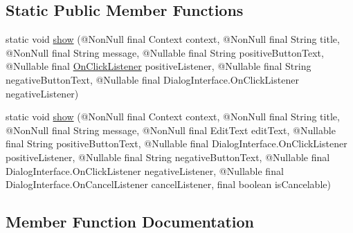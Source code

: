 \subsection*{Static Public Member Functions}
\begin{DoxyCompactItemize}
\item 
static void \hyperlink{classcom_1_1toast_1_1android_1_1gamebase_1_1base_1_1ui_1_1_simple_input_text_dialog_a8130d76a663da8049cc74f985c25605e}{show} (@Non\+Null final Context context, @Non\+Null final String title, @Non\+Null final String message, @Nullable final String positive\+Button\+Text, @Nullable final \hyperlink{interfacecom_1_1toast_1_1android_1_1gamebase_1_1base_1_1ui_1_1_simple_input_text_dialog_1_1_on_click_listener}{On\+Click\+Listener} positive\+Listener, @Nullable final String negative\+Button\+Text, @Nullable final Dialog\+Interface.\+On\+Click\+Listener negative\+Listener)
\item 
static void \hyperlink{classcom_1_1toast_1_1android_1_1gamebase_1_1base_1_1ui_1_1_simple_input_text_dialog_a6701f37dd465b15b78b87b174b289c52}{show} (@Non\+Null final Context context, @Non\+Null final String title, @Non\+Null final String message, @Non\+Null final Edit\+Text edit\+Text, @Nullable final String positive\+Button\+Text, @Nullable final Dialog\+Interface.\+On\+Click\+Listener positive\+Listener, @Nullable final String negative\+Button\+Text, @Nullable final Dialog\+Interface.\+On\+Click\+Listener negative\+Listener, @Nullable final Dialog\+Interface.\+On\+Cancel\+Listener cancel\+Listener, final boolean is\+Cancelable)
\end{DoxyCompactItemize}


\subsection{Member Function Documentation}
\mbox{\label{classcom_1_1toast_1_1android_1_1gamebase_1_1base_1_1ui_1_1_simple_input_text_dialog_a8130d76a663da8049cc74f985c25605e}} 

